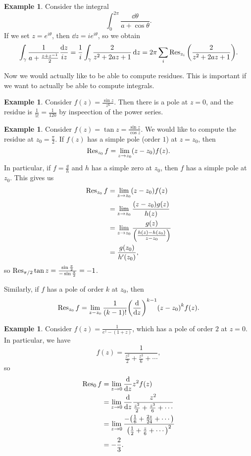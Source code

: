 \documentclass[leqno, openany]{memoir}
\theoremstyle{definition}
\newtheorem{exm}[thm]{Example}
\theoremstyle{remark}
\theoremstyle{plain}
\theoremstyle{definition}
\theoremstyle{remark}
\begin{document}
\begin{exm} Consider the integral \[ \int_0^{2 \pi} \frac{\dd{\theta}}{a + \cos
    \theta}. \] If we set $z = e^{i \theta}$, then $\dd{z} = ie^{i\theta}$, so
    we obtain \[ \int_{\gamma} \frac{1}{a + \frac{z+z^{-1}}{2}}
    \frac{\dd{z}}{iz} = \frac{1}{i} \int_{\gamma} \frac{2}{z^2 + 2az + 1}
\dd{z} = 2 \pi \sum_{i} \Res_{z_i} \qty(\frac{2}{z^2 + 2az + 1}). \] \end{exm}

Now we would actually like to be able to compute residues. This is important if
we want to actually be able to compute integrals.

\begin{exm} Consider $f(z) = \frac{\sin z}{z^6}$. Then there is a pole at $z =
0$, and the residue is $\frac{1}{5!} = \frac{1}{120}$ by inspeection of the
power series.  \end{exm}

\begin{exm} Consider $f(z) = \tan z = \frac{\sin z}{\cos z}$. We would like to
    compute the residue at $z_0 = \frac{\pi}{2}$. If $f(z)$ has a simple pole
    (order $1$) at $z = z_0$, then \[ \Res_{z_0} f = \lim_{z \to z_0} (z-z_0)
    f(z). \] In particular, if $f = \frac{g}{h}$ and $h$ has a simple zero at
    $z_0$, then $f$ has a simple pole at $z_0$. This gives us \begin{align*}
        \Res_{z_0} f &= \lim_{z \to z_0} (z-z_0) f(z) \\ &= \lim_{z \to z_0}
        \frac{(z-z_0)g(z)}{h(z)} \\ &= \lim_{z \to z_0}
        \frac{g(z)}{\qty(\frac{h(z)-h(z_0)}{z-z_0})} \\ &=
    \frac{g(z_0)}{h'(z_0)}, \end{align*} so $\Res_{\pi/2} \tan z = \frac{\sin
\frac{\pi}{2}}{-\sin \frac{\pi}{2}} = -1$.  \end{exm}

Similarly, if $f$ has a pole of order $k$ at $z_0$, then \[ \Res_{z_0} f =
\lim_{z - z_0} \frac{1}{(k-1)!} {\qty(\dv{z})}^{k-1} {(z-z_0)}^k f(z). \]

\begin{exm} Consider $f(z) = \frac{1}{e^z - (1+z)}$, which has a pole of order
    $2$ at $z = 0$. In particular, we have \[ f(z) = \frac{1}{\frac{z^2}{2} +
        \frac{z^3}{6} + \cdots}, \] so \begin{align*} \Res_0 f &= \lim_{z \to
    0} \dv{z} z^2 f(z) \\ &= \lim_{z \to 0} \dv{z} \frac{z^2}{\frac{z^2}{2} +
\frac{z^3}{6} + \cdots} \\ &= \lim_{z \to 0} \frac{- \qty(\frac{1}{6} +
\frac{2z}{24} + \cdots)}{{\qty(\frac{1}{2} + \frac{z}{6} + \cdots)}^2} \\ &= -
\frac{2}{3}.  \end{align*} \end{exm}
\end{document}
